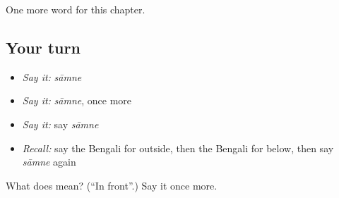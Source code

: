 \begin{grammarlens}[title={What you've built}]
One more word for this chapter.
\end{grammarlens}

\subsection*{Your turn}
\begin{itemize}
\raggedright
  \item \emph{Say it:} \emph{sāmne}
  \item \emph{Say it:} \emph{sāmne}, once more
  \item \emph{Say it:} say \emph{sāmne}
  \item \emph{Recall:} say the Bengali for outside, then the Bengali for below, then say \emph{sāmne} again
\end{itemize}

\begin{tcolorbox}[breakable,colback=teal!4,colframe=teal!35!black,title={Before you move on}]
What does  mean? (\textquotedblleft{}In front\textquotedblright{}.) Say it once more.
\end{tcolorbox}
